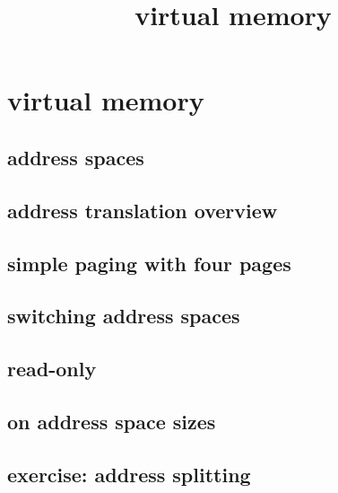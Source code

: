 \graphicspath{{./figures/}}
\title{virtual memory}
\date{}

\begin{frame}
    \titlepage
\end{frame}

\section{virtual memory}

\subsection{address spaces}


\subsection{address translation overview}




\subsection{simple paging with four pages}



\subsection{switching address spaces}




\subsection{read-only}


\subsection{on address space sizes}


\subsection{exercise: address splitting}



